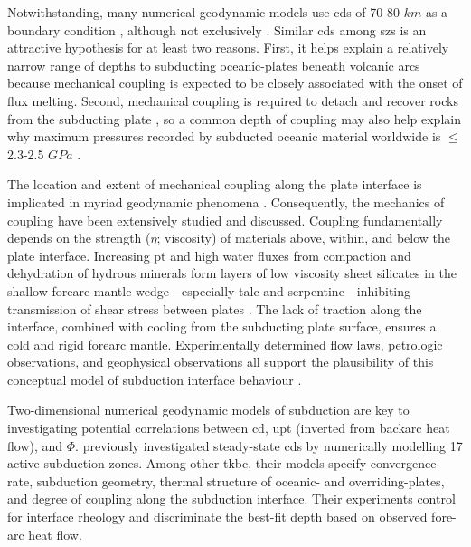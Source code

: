 Notwithstanding, many numerical geodynamic models use \glspl{cd} of 70-80 \(km\) as a boundary condition \citep[e.g.,][]{Abers2017, Currie2004, Syracuse2010, VanKeken2011, VanKeken2018, Wada2012, Gao2014, Wilson2014}, although not exclusively \citep[e.g.~40-56 \(km\),][]{England2010, Peacock1996}. Similar \glspl{cd} among \glspl{sz} is an attractive hypothesis for at least two reasons. First, it helps explain a relatively narrow range of depths to subducting oceanic-plates beneath volcanic arcs \citep{England2004, Syracuse2006} because mechanical coupling is expected to be closely associated with the onset of flux melting. Second, mechanical coupling is required to detach and recover rocks from the subducting plate \citep{Agard2016}, so a common depth of coupling may also help explain why maximum pressures recorded by subducted oceanic material worldwide is \(\leq\) 2.3-2.5 \(GPa\) \citep[roughly 80 \(km\),][]{Agard2009, Agard2018}.

The location and extent of mechanical coupling along the plate interface is implicated in myriad geodynamic phenomena \citep[seismicity, metamorphism, volatile fluxes into the mantle wedge, volcanism, and plate motions, e.g.,][]{Cizkova2013, Gonzalez2016, Peacock1990, Peacock1991, Peacock1993, Peacock1996, Peacock1999a, Hacker2003, VanKeken2011, Grove2012, Gao2017}. Consequently, the mechanics of coupling have been extensively studied and discussed. Coupling fundamentally depends on the strength (\(\eta\); viscosity) of materials above, within, and below the plate interface. Increasing \gls{pt} and high water fluxes from compaction and dehydration of hydrous minerals form layers of low viscosity sheet silicates in the shallow forearc mantle wedge---especially talc and serpentine---inhibiting transmission of shear stress between plates \citep{Peacock1999a}. The lack of traction along the interface, combined with cooling from the subducting plate surface, ensures a cold and rigid forearc mantle. Experimentally determined flow laws, petrologic observations, and geophysical observations all support the plausibility of this conceptual model of subduction interface behaviour \citep[e.g.,][]{Agard2016, Agard2018, Gao2014, Peacock1999a}.

Two-dimensional numerical geodynamic models of subduction are key to investigating potential correlations between \gls{cd}, \gls{upt} (inverted from backarc heat flow), and \(\Phi\). \citet{Wada2009} previously investigated steady-state \glspl{cd} by numerically modelling 17 active subduction zones. Among other \gls{tkbc}, their models specify convergence rate, subduction geometry, thermal structure of oceanic- and overriding-plates, and degree of coupling along the subduction interface. Their experiments control for interface rheology and discriminate the best-fit depth based on observed fore-arc heat flow.

